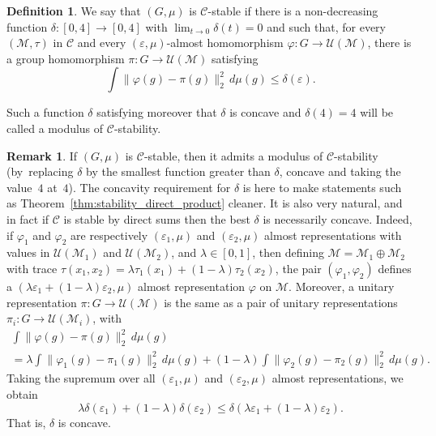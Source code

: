 \documentclass[10pt]{amsart}
\theoremstyle{plain}
\theoremstyle{definition}
\newtheorem{definition}[theorem]{Definition}
\newtheorem{remark}[theorem]{Remark}
\newcommand{\cM}{\mathcal{M}}
\newcommand{\vn}{\mathcal{C}}
\newcommand{\cU}{\mathcal{U}}
\begin{document}
\begin{definition}\label{def:stability}
We say that $(G,\mu)$ is $\vn$-stable if there is a non-decreasing
function $\delta:[0,4]\to [0,4]$ with $\lim_{t \to 0} \delta(t)= 0$ and such that, for every $(\cM,\tau)$ in $\vn$ and every $(\varepsilon,\mu)$-almost homomorphism $\varphi: G \to \cU(\cM)$, there is a group homomorphism $\pi:G \to
\cU(\cM)$ satisfying
\[
\int \|\varphi(g) - \pi(g)\|_2^2 \,d\mu(g) \leq \delta(\varepsilon).
\]

Such a function $\delta$ satisfying moreover that $\delta$ is concave and $\delta(4)= 4$ will be called a modulus of $\vn$-stability.
\end{definition}
\begin{remark} If $(G,\mu)$ is $\vn$-stable, then it admits a modulus of $\vn$-stability (by~replacing $\delta$ by the smallest function greater than $\delta$, concave and taking the value~$4$ at~$4$). The concavity requirement for $\delta$ is here to make statements such as Theorem~\ref{thm:stability_direct_product} cleaner. It is also very natural, and in fact if $\vn$ is stable by direct sums then the best $\delta$ is necessarily concave. Indeed, if $\varphi_1$ and $\varphi_2$ are respectively $(\varepsilon_1,\mu)$ and $(\varepsilon_2,\mu)$ almost representations with values in $\cU(\cM_1)$ and $\cU(\cM_2)$, and $\lambda \in [0,1]$, then defining $\cM = \cM_1\oplus \cM_2$ with trace $\tau(x_1,x_2) = \lambda \tau_1(x_1) + (1-\lambda)\tau_2(x_2)$, the pair $(\varphi_1,\varphi_2)$ defines a $(\lambda\varepsilon_1+(1-\lambda)\varepsilon_2,\mu)$ almost representation $\varphi$ on $\cM$. Moreover, a unitary representation $\pi:G\to \cU(\cM)$ is the same as a pair of unitary representations $\pi_i:G\to \cU(\cM_i)$, with
\begin{multline*} \int \|\varphi(g) - \pi(g)\|_2^2 \,d\mu(g) \\=\lambda \int \|\varphi_1(g) - \pi_1(g)\|_2^2 \,d\mu(g) + (1-\lambda) \int \|\varphi_2(g) - \pi_2(g)\|_2^2 \,d\mu(g).
\end{multline*}
Taking the supremum over all $(\varepsilon_1,\mu)$ and $(\varepsilon_2,\mu)$ almost representations, we obtain
\[
\lambda\delta(\varepsilon_1) + (1-\lambda)\delta(\varepsilon_2) \leq \delta(\lambda\varepsilon_1+(1-\lambda)\varepsilon_2).
\]
That is, $\delta$ is concave.
\end{remark}
\end{document}
